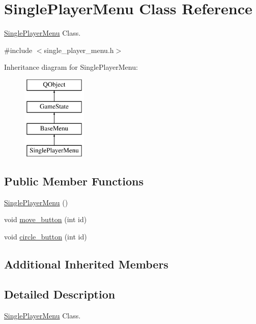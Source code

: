 \hypertarget{class_single_player_menu}{\section{Single\-Player\-Menu Class Reference}
\label{class_single_player_menu}
}


\hyperlink{class_single_player_menu}{Single\-Player\-Menu} Class.  




{\ttfamily \#include $<$single\-\_\-player\-\_\-menu.\-h$>$}

Inheritance diagram for Single\-Player\-Menu\-:\begin{figure}[H]
\begin{center}
\leavevmode
\includegraphics[height=4.000000cm]{class_single_player_menu}
\end{center}
\end{figure}
\subsection*{Public Member Functions}
\begin{DoxyCompactItemize}
\item 
\hyperlink{class_single_player_menu_ae08904afd98c7acdc73afe9722c3af27}{Single\-Player\-Menu} ()
\item 
void \hyperlink{class_single_player_menu_a723231c6f869d10b6216129164f2010e}{move\-\_\-button} (int id)
\item 
void \hyperlink{class_single_player_menu_a99cd7d7a059520b9e2390565ba2184fd}{circle\-\_\-button} (int id)
\end{DoxyCompactItemize}
\subsection*{Additional Inherited Members}


\subsection{Detailed Description}
\hyperlink{class_single_player_menu}{Single\-Player\-Menu} Class. 

